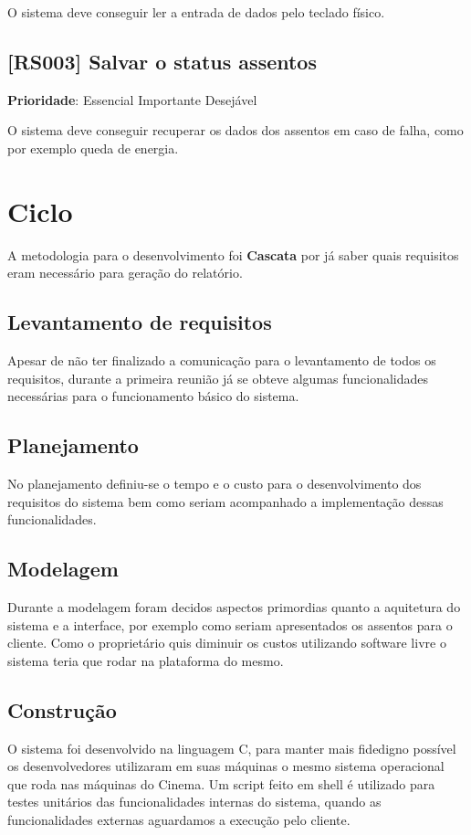 \documentclass[12pt,a4paper]{article}
\let\oldsection\section
\renewcommand\section{\clearpage\oldsection}
\begin{document}
O sistema deve conseguir ler a entrada de dados pelo teclado físico.

\subsection{[RS003] Salvar o status assentos}

\textbf{Prioridade}:
\mbox{\ooalign{$\checkmark$\cr\hidewidth$\square$\hidewidth\cr}} Essencial
\mbox{\ooalign{\cr\hidewidth$\square$\hidewidth\cr}} Importante
\mbox{\ooalign{\cr\hidewidth$\square$\hidewidth\cr}} Desejável

O sistema deve conseguir recuperar os dados dos assentos em caso de falha, como
por exemplo queda de energia.

\section{Ciclo}

A metodologia para o desenvolvimento foi \textbf{Cascata} por já saber
quais requisitos eram necessário para geração do relatório.

\subsection{Levantamento de requisitos}
Apesar de não ter finalizado a comunicação para o levantamento de todos
os requisitos, durante a primeira reunião já se obteve algumas funcionalidades
necessárias para o funcionamento básico do sistema.

\subsection{Planejamento}
No planejamento definiu-se o tempo e o custo para o desenvolvimento dos
requisitos do sistema bem como seriam acompanhado a implementação dessas
funcionalidades.

\subsection{Modelagem}
Durante a modelagem foram decidos aspectos primordias quanto a aquitetura
do sistema e a interface, por exemplo como seriam apresentados os assentos
para o cliente. Como o proprietário quis diminuir os custos utilizando software
livre o sistema teria que rodar na plataforma do mesmo.

\subsection{Construção}
O sistema foi desenvolvido na linguagem C, para manter mais fidedigno possível
os desenvolvedores utilizaram em suas máquinas o mesmo sistema operacional que 
roda nas máquinas do Cinema. Um script feito em shell é utilizado para testes
unitários das funcionalidades internas do sistema, quando as funcionalidades
externas aguardamos a execução pelo cliente.
\end{document}
